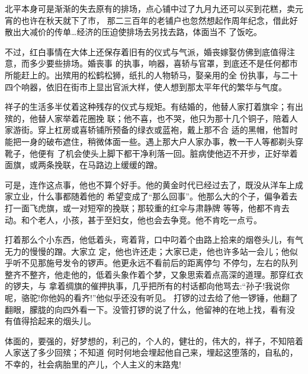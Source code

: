 \documentclass[11pt,a4paper,onecolumn]{article}
\begin{document}
北平本身可是渐渐的失去原有的排场，点心铺中过了九月九还可以买到花糕，卖元宵的也许在秋天就下了市，
那二三百年的老铺户也忽然想起作周年纪念，借此好散出大减价的传单\ldots 经济的压迫使排场去另找去路，体面当不
了饭吃。

不过，红白事情在大体上还保存着旧有的仪式与气派，婚丧嫁娶仿佛到底值得注意，而多少要些排场。婚丧事
的执事，响器，喜轿与官罩，到底还不是任何都市所能赶上的。出殡用的松鹤松狮，纸扎的人物轿马，娶亲用的全
份执事，与二十四个响器，依旧在街市上显出官派大样，使人想到那太平年代的繁华与气度。

祥子的生活多半仗着这种残存的仪式与规矩。有结婚的，他替人家打着旗伞；有出殡的，他替人家举着花圈挽
联；他不喜，也不哭，他只为那十几个铜子，陪着人家游街。穿上杠房或喜轿铺所预备的绿衣或蓝袍，戴上那不合
适的黑帽，他暂时能把一身的破布遮住，稍微体面一些。遇上那大户人家办事，教一干人等都剃头穿靴子，他便有
了机会使头上脚下都干净利落一回。脏病使他迈不开步，正好举着面旗，或两条挽联，在马路边上缓缓的蹭。

可是，连作这点事，他也不算个好手。他的黄金时代已经过去了，既没从洋车上成家立业，什么事都随着他的
希望变成了``那么回事''。他那么大的个子，偏争着去打一面飞虎旗，或一对短窄的挽联；那较重的红伞与肃静牌
等等，他都不肯去动。和个老人，小孩，甚于至妇女，他也会去争竞。他不肯吃一点亏。

打着那么个小东西，他低着头，弯着背，口中叼着个由路上拾来的烟卷头儿，有气无力的慢慢的蹭。大家立
定，他也许还走；大家已走，他也许多站一会儿；他似乎听不见那施号发令的锣声。他更永远不看前后的距离停匀
不停匀，左右的队列整齐不整齐，他走他的，低着头象作着个梦，又象思索着点高深的道理。那穿红衣的锣夫，与
拿着绸旗的催押执事，几乎把所有的村话都向他骂去:``孙子!我说你呢，骆驼!你他妈的看齐!''他似乎还没有听见。
打锣的过去给了他一锣锤，他翻了翻眼，朦胧的向四外看一下。没管打锣的说了什么，他留神的在地上找，看有没
有值得拾起来的烟头儿。

体面的，要强的，好梦想的，利己的，个人的，健壮的，伟大的，祥子，不知陪着人家送了多少回殡；不知道
何时何地会埋起他自己来，埋起这堕落的，自私的，不幸的，社会病胎里的产儿，个人主义的末路鬼!
\end{document}
